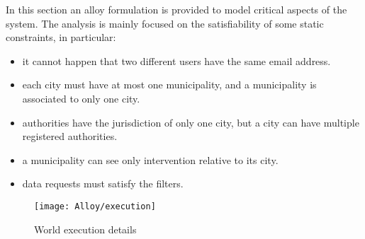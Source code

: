 In this section an alloy formulation is provided to model critical aspects of the system. The analysis is mainly focused on the satisfiability of some static constraints, in particular:
\begin{itemize}
	\item it cannot happen that two different users have the same email address.
	\item each city must have at most one municipality, and a municipality is associated to only one city.
	\item authorities have the jurisdiction of only one city, but a city can have multiple registered authorities.
	\item a municipality can see only intervention relative to its city.
	\item data requests must satisfy the filters.
\end{itemize}

\vspace{10mm}


\begin{figure}[H]
	\centering
	\texttt{[image: Alloy/execution]}
	\caption{World execution details}
\end{figure}

